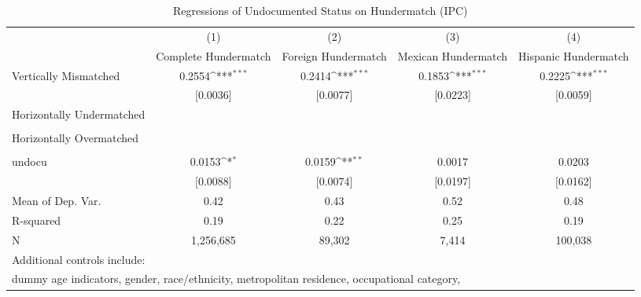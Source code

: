 \begin{table}[htbp]\centering
\def\sym#1{\ifmmode^{#1}\else\(^{#1}\)\fi}
\caption{Regressions of Undocumented Status on Hundermatch (IPC)}
\begin{tabular}{l*{4}{c}}
\toprule
                    &\multicolumn{1}{c}{(1)}         &\multicolumn{1}{c}{(2)}         &\multicolumn{1}{c}{(3)}         &\multicolumn{1}{c}{(4)}         \\
                    &Complete Hundermatch         &Foreign Hundermatch         &Mexican Hundermatch         &Hispanic Hundermatch         \\
\midrule
Vertically Mismatched&      0.2554\sym{***}&      0.2414\sym{***}&      0.1853\sym{***}&      0.2225\sym{***}\\
                    &    [0.0036]         &    [0.0077]         &    [0.0223]         &    [0.0059]         \\
\addlinespace
Horizontally Undermatched&                     &                     &                     &                     \\
                    &                     &                     &                     &                     \\
\addlinespace
Horizontally Overmatched&                     &                     &                     &                     \\
                    &                     &                     &                     &                     \\
\addlinespace
undocu              &      0.0153\sym{*}  &      0.0159\sym{**} &      0.0017         &      0.0203         \\
                    &    [0.0088]         &    [0.0074]         &    [0.0197]         &    [0.0162]         \\
\midrule
Mean of Dep. Var.   &        0.42         &        0.43         &        0.52         &        0.48         \\
R-squared           &        0.19         &        0.22         &        0.25         &        0.19         \\
N                   &   1,256,685         &      89,302         &       7,414         &     100,038         \\
\bottomrule
\multicolumn{5}{l}{\footnotesize Additional controls include:}\\
\multicolumn{5}{l}{\footnotesize dummy age indicators, gender, race/ethnicity, metropolitan residence, occupational category,}\\

\end{tabular}
\end{table}
